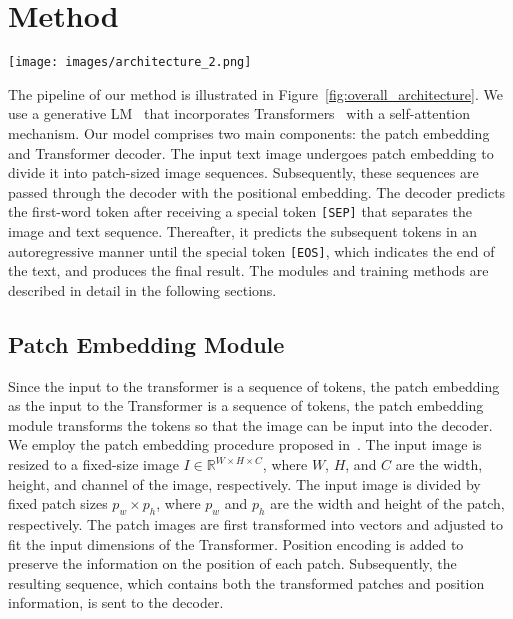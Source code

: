 \documentclass[10pt,twocolumn,letterpaper]{article}
\begin{document}
\section{Method} \label{method}
\begin{figure*}[htp]
	\centering
	\texttt{[image: images/architecture\_2.png]}
	\caption{
Architecture of proposed DTrOCR, which
consists of patch embedding and decoder modules.
The input images are transformed into one-dimensional sequences using the patch embedding and then sent to the decoder along with the positional encoding. 
The decoder uses the special token \texttt{[SEP]} to indicate sequence separation.
Thereafter, it predicts the subsequent word token based on the sequence condition.
It continues to generate text autoregressively until it reaches the end of the text token \texttt{[EOS]}.
	}
	\label{fig:overall_architecture}
\end{figure*}

The pipeline of our method is illustrated in Figure~\ref{fig:overall_architecture}.
We use a generative LM~\cite{radford2019language} that incorporates Transformers~\cite{vaswani2017transformer} with a self-attention mechanism. 
Our model comprises two main components: the patch embedding and Transformer decoder. 
The input text image undergoes patch embedding to divide it into patch-sized image sequences. 
Subsequently, these sequences are passed through the decoder with the positional embedding. 
The decoder predicts the first-word token after receiving a special token \texttt{[SEP]} that separates the image and text sequence. 
Thereafter, it predicts the subsequent tokens in an autoregressive manner until the special token \texttt{[EOS]}, which indicates the end of the text, and produces the final result. 
The modules and training methods are described in detail in the following sections.

\subsection{Patch Embedding Module}
Since the input to the transformer is a sequence of tokens, the patch embedding as the input to the Transformer is a sequence of tokens, the patch embedding module transforms the tokens so that the image can be input into the decoder.
We employ the patch embedding procedure proposed in~\cite{dosovitskiy2020vit}.
The input image is resized to a fixed-size image $I \in \mathbb{R}^{W \times H \times C}$, where $W$, $H$, and $C$ are the width, height, and channel of the image, respectively.
The input image is divided by fixed patch sizes $p_{w} \times p_{h}$, where $p_{w}$ and $p_{h}$ are the width and height of the patch, respectively.
The patch images are first transformed into vectors and adjusted to fit the input dimensions of the Transformer.
Position encoding is added to preserve the information on the position of each patch. 
Subsequently, the resulting sequence, which contains both the transformed patches and position information, is sent to the decoder.
\end{document}
